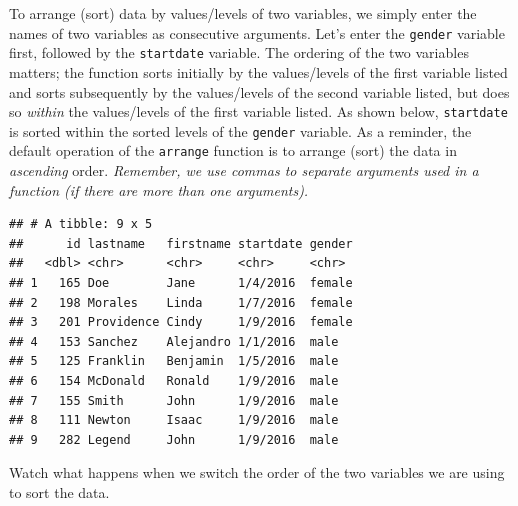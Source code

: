 \documentclass[]{book}
\newenvironment{Shaded}{\begin{snugshade}}{\end{snugshade}}
\newcommand{\KeywordTok}[1]{\textcolor[rgb]{0.13,0.29,0.53}{\textbf{#1}}}
\newcommand{\StringTok}[1]{\textcolor[rgb]{0.31,0.60,0.02}{#1}}
\newcommand{\CommentTok}[1]{\textcolor[rgb]{0.56,0.35,0.01}{\textit{#1}}}
\newcommand{\OperatorTok}[1]{\textcolor[rgb]{0.81,0.36,0.00}{\textbf{#1}}}
\newcommand{\NormalTok}[1]{#1}
\begin{document}
To arrange (sort) data by values/levels of two variables, we simply
enter the names of two variables as consecutive arguments. Let's enter
the \texttt{gender} variable first, followed by the \texttt{startdate}
variable. The ordering of the two variables matters; the function sorts
initially by the values/levels of the first variable listed and sorts
subsequently by the values/levels of the second variable listed, but
does so \emph{within} the values/levels of the first variable listed. As
shown below, \texttt{startdate} is sorted within the sorted levels of
the \texttt{gender} variable. As a reminder, the default operation of
the \texttt{arrange} function is to arrange (sort) the data in
\emph{ascending} order. \emph{Remember, we use commas to separate
arguments used in a function (if there are more than one arguments).}

\begin{Shaded}
\end{Shaded}

\begin{verbatim}
## # A tibble: 9 x 5
##      id lastname   firstname startdate gender
##   <dbl> <chr>      <chr>     <chr>     <chr> 
## 1   165 Doe        Jane      1/4/2016  female
## 2   198 Morales    Linda     1/7/2016  female
## 3   201 Providence Cindy     1/9/2016  female
## 4   153 Sanchez    Alejandro 1/1/2016  male  
## 5   125 Franklin   Benjamin  1/5/2016  male  
## 6   154 McDonald   Ronald    1/9/2016  male  
## 7   155 Smith      John      1/9/2016  male  
## 8   111 Newton     Isaac     1/9/2016  male  
## 9   282 Legend     John      1/9/2016  male
\end{verbatim}

Watch what happens when we switch the order of the two variables we are
using to sort the data.

\begin{Shaded}
\end{Shaded}
\end{document}
